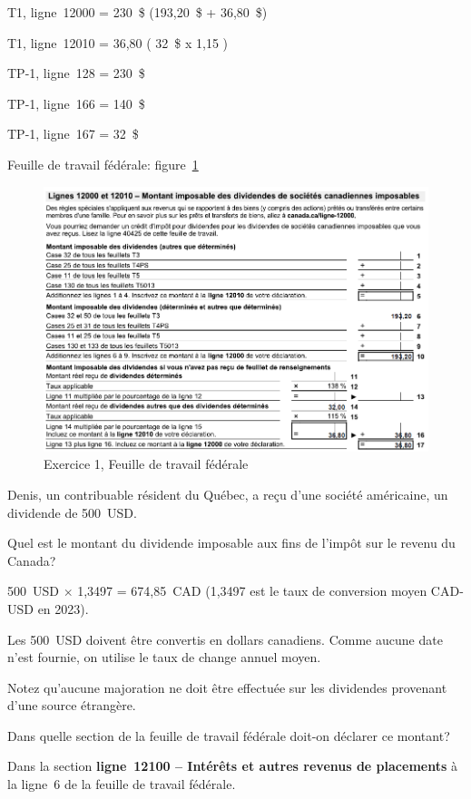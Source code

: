 T1, ligne~12000 = 230~\$ (193,20~\$ + 36,80~\$)

T1, ligne~12010 = 36,80 ( 32~\$ x 1,15 )

TP-1, ligne~128 = 230~\$

TP-1, ligne~166 = 140~\$

TP-1, ligne~167 = 32~\$

Feuille de travail fédérale: figure~\ref{fig:chap6Exercice1FeuilleTravail}

\begin{figure}
	\centering
	\includegraphics[width=.9\textwidth]{exercice/6-1/Q2/FeuilleTravail.png}
	\caption[]{Exercice 1, Feuille de travail fédérale}
	\label{fig:chap6Exercice1FeuilleTravail}
\end{figure}

\begin{question}
	Denis, un contribuable résident du Québec, a reçu d'une société américaine, un dividende de 500~USD.
\end{question}

\setcounter{sousQuestion}{0}
\begin{sousQuestion}
	Quel est le montant du dividende imposable aux fins de l'impôt sur le revenu du Canada?
\end{sousQuestion}
500~USD $\times$ 1,3497 = 674,85~CAD (1,3497 est le taux de conversion moyen CAD-USD en 2023).

Les 500~USD doivent être convertis en dollars canadiens. Comme aucune date n'est fournie, on utilise le taux de change annuel moyen.

Notez qu'aucune majoration ne doit être effectuée sur les dividendes provenant d'une source étrangère.

\begin{sousQuestion}
	Dans quelle section de la feuille de travail fédérale doit-on déclarer ce montant?
\end{sousQuestion}
Dans la section \og \textbf{ligne~12100 – Intérêts et autres revenus de placements} \fg{} à la ligne~6 de la feuille de travail fédérale.

